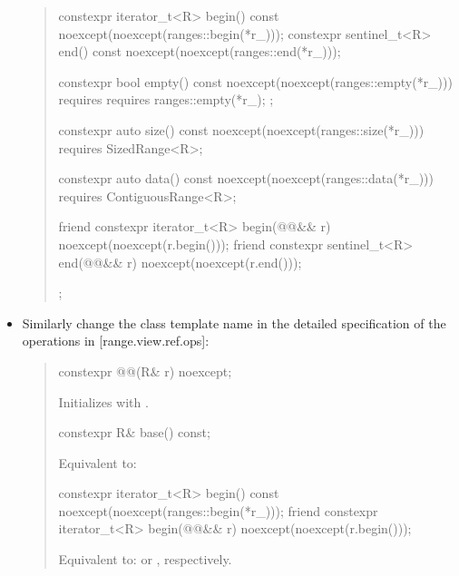 \begin{itemize}
\begin{quote}
\begin{codeblock}
{{    constexpr iterator_t<R> begin() const
      noexcept(noexcept(ranges::begin(*r_)));
    constexpr sentinel_t<R> end() const
      noexcept(noexcept(ranges::end(*r_)));

    constexpr bool empty() const
      noexcept(noexcept(ranges::empty(*r_)))
      requires requires { ranges::empty(*r_); };

    constexpr auto size() const
      noexcept(noexcept(ranges::size(*r_)))
      requires SizedRange<R>;

    constexpr auto data() const
      noexcept(noexcept(ranges::data(*r_)))
      requires ContiguousRange<R>;

    friend constexpr iterator_t<R> begin(@@&& r)
      noexcept(noexcept(r.begin()));
    friend constexpr sentinel_t<R> end(@@&& r)
      noexcept(noexcept(r.end()));
  };
}
\end{codeblock}
  \end{quote}
\item Similarly change the class template name in the detailed specification of
  the operations in [range.view.ref.ops]:
  \begin{quote}
\setcounter{Paras}{0}
\begin{itemdecl}
constexpr @@(R& r) noexcept;
\end{itemdecl}

\begin{itemdescr}
\pnum
\effects Initializes  with .
\end{itemdescr}

\begin{itemdecl}
constexpr R& base() const;
\end{itemdecl}

\begin{itemdescr}
\pnum
\effects Equivalent to: 
\end{itemdescr}

\begin{itemdecl}
constexpr iterator_t<R> begin() const
  noexcept(noexcept(ranges::begin(*r_)));
friend constexpr iterator_t<R> begin(@@&& r)
  noexcept(noexcept(r.begin()));
\end{itemdecl}

\begin{itemdescr}
\pnum
\effects Equivalent to: 
or , respectively.
\end{itemdescr}


\end{quote}
\end{itemize}
